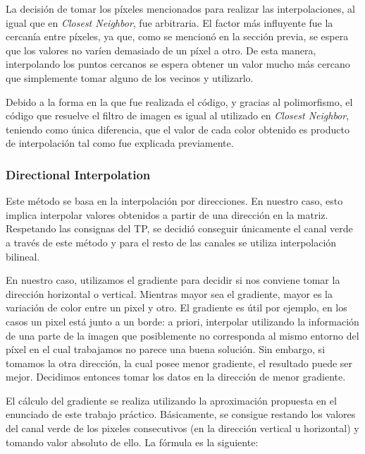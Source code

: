 \vspace{\baselineskip}

La decisión de tomar los píxeles mencionados para realizar las interpolaciones, al igual que en \textit{Closest Neighbor}, fue arbitraria. El factor más influyente fue la cercanía entre píxeles, ya que, como se mencionó en la sección previa, se espera que los valores no varíen demasiado de un píxel a otro. De esta manera, interpolando los puntos cercanos se espera obtener un valor mucho más cercano que simplemente tomar alguno de los vecinos y utilizarlo.

\vspace{\baselineskip}

Debido a la forma en la que fue realizada el código, y gracias al polimorfismo, el código que resuelve el filtro de imagen es igual al utilizado en \textit{Closest Neighbor}, teniendo como única diferencia, que el valor de cada color obtenido es producto de interpolación tal como fue explicada previamente.

\subsubsection{Directional Interpolation}

Este método se basa en la interpolación por direcciones. En nuestro caso, esto implica interpolar valores obtenidos a partir de una dirección en la matriz. Respetando las consignas del TP, se decidió conseguir únicamente el canal verde a través de este método y para el resto de las canales se utiliza interpolación bilineal.

\vspace{\baselineskip}

En nuestro caso, utilizamos el gradiente para decidir si nos conviene tomar la dirección horizontal o vertical. Mientras mayor sea el gradiente, mayor es la variación de color entre un pixel y otro. El gradiente es útil por ejemplo, en los casos un pixel está junto a un borde: a priori, interpolar utilizando la información de una parte de la imagen que posiblemente no corresponda al mismo entorno del píxel en el cual trabajamos no parece una buena solución. Sin embargo, si tomamos la otra dirección, la cual posee menor gradiente, el resultado puede ser mejor. Decidimos entonces tomar los datos en la dirección de menor gradiente.

\vspace{\baselineskip}

El cálculo del gradiente se realiza utilizando la aproximación propuesta en el enunciado de este trabajo práctico. Básicamente, se consigue restando los valores del canal verde de los pixeles consecutivos (en la dirección vertical u horizontal) y tomando valor absoluto de ello. La fórmula es la siguiente: 

